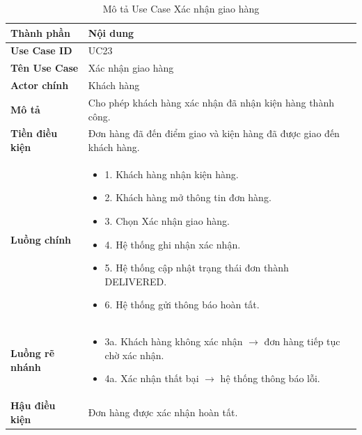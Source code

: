 \begin{longtable}{|L{3cm}|L{11cm}|}
\caption{Mô tả Use Case Xác nhận giao hàng}
\label{tab:mo-ta-uc23-xac-nhan-giao-hang}
\\
\hline
\textbf{Thành phần} & \textbf{Nội dung} \\
\hline
\textbf{Use Case ID} & UC23 \\
\hline
\textbf{Tên Use Case} & Xác nhận giao hàng \\
\hline
\textbf{Actor chính} & Khách hàng \\
\hline
\textbf{Mô tả} & Cho phép khách hàng xác nhận đã nhận kiện hàng thành công. \\
\hline
\textbf{Tiền điều kiện} & Đơn hàng đã đến điểm giao và kiện hàng đã được giao đến khách hàng. \\
\hline
\textbf{Luồng chính} & \begin{itemize}[leftmargin=*,topsep=2pt,itemsep=2pt]
\item 1. Khách hàng nhận kiện hàng.
\item 2. Khách hàng mở thông tin đơn hàng.
\item 3. Chọn Xác nhận giao hàng.
\item 4. Hệ thống ghi nhận xác nhận.
\item 5. Hệ thống cập nhật trạng thái đơn thành DELIVERED.
\item 6. Hệ thống gửi thông báo hoàn tất.
\end{itemize} \\
\hline
\textbf{Luồng rẽ nhánh} & \begin{itemize}[leftmargin=*,topsep=2pt,itemsep=2pt]
\item 3a. Khách hàng không xác nhận $\rightarrow$ đơn hàng tiếp tục chờ xác nhận.
\item 4a. Xác nhận thất bại $\rightarrow$ hệ thống thông báo lỗi.
\end{itemize} \\
\hline
\textbf{Hậu điều kiện} & Đơn hàng được xác nhận hoàn tất. \\
\hline
\end{longtable}
